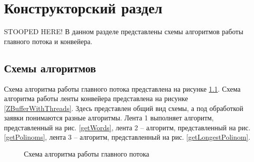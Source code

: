 \chapter{Конструкторский раздел}
STOOPED HERE!
В данном разделе представлены схемы алгоритмов работы главного потока и конвейера.

\section{Схемы алгоритмов}
Схема алгоритма работы главного потока представлена  на рисунке \ref{ZBufferAlg}.
Схема алгоритма работы ленты конвейера представлена  на рисунке \ref{ZBufferWithThreads}. Здесь представлен общий вид схемы, а под обработкой заявки понимаются разные алгоритмы. Лента 1 выполняет алгоритм, представленный на рис. \ref{getWords}, лента 2 -- алгоритм, представленный на рис. \ref{getPolinoms}, лента 3 -- алгоритм, представленный на рис. \ref{getLongestPolinom}.  

\begin{figure}
	\caption{Схема алгоритма работы главного потока}
	\label{ZBufferAlg}
\end{figure}

